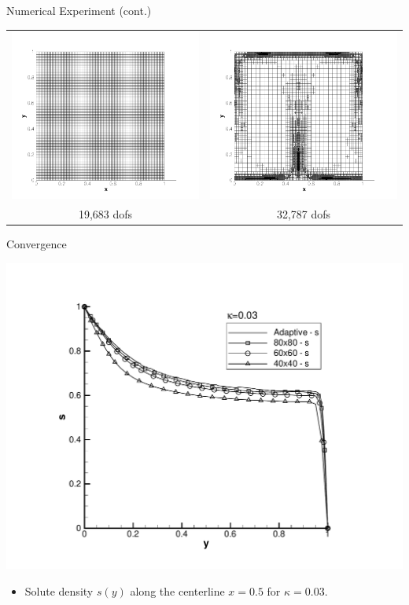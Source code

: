 \documentclass[compress,12pt]{beamer}
\begin{document}
\begin{frame}{Numerical Experiment (cont.)}
    {
      \begin{center}\begin{tabular}{cc} \\
	\includegraphics[width=.5\textwidth]{figures/grid_80x80}&
	\includegraphics[width=.5\textwidth]{figures/grid_adapt_kappa_0_03}\\
	19,683 dofs &
	32,787 dofs
      \end{tabular}\end{center}
    }
\end{frame}



\begin{frame}{Convergence}
  \begin{center}
    \includegraphics[viewport=124 40 670 550,width=.65\textwidth,clip=true]{figures/s_x_equal_0_point_5}
    \begin{itemize}
    \item Solute density $s(y)$ along the centerline $x=0.5$ for $\kappa=0.03$.
    \end{itemize}
  \end{center}      
\end{frame}
\end{document}
